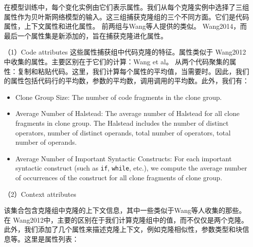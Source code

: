 
在模型训练中，每个变化实例由它们表示属性。我们从每个克隆实例中选择了三组属性作为贝叶斯网络模型的输入。这三组捕获克隆组的三个不同方面。它们是代码属性，上下文属性和进化属性。
前两组与Wang等人提供的类似。 \cite{} {Wang2014}，而最后一个属性集是新添加的，旨在捕获克隆进化属性。

（1）{Code attributes}
这些属性捕获组中代码克隆的特征。属性类似于\cite{} {Wang2012}中收集的属性。主要区别在于它们的计算：Wang et al。 从两个代码聚集的属性：复制和粘贴代码。这里，我们计算每个属性的平均值，当需要时。因此，我们的属性包括代码行的平均数，参数的平均数，调用调用的平均数。此外，我们有：
\begin{itemize}
\item Clone Group Size: 
The number of code fragments in the clone group.
\item Average Number of Halstead: 
The average number of Halstead for all clone fragments in clone group. The Halstead includes the number of distinct operators, number of distinct operands, total number of operators, total number of operands.
\item Average Number of Important Syntactic Constructs: 
For each important syntactic construct (such as \verb+if+, \verb+while+, etc.), we compute the average number of occurrences of the construct for all clone fragments of clone group.
\end{itemize}

（2）Context attributes

该集合包含克隆组中克隆的上下文信息，其中一些类似于Wang等人收集的那些。 在\cite{} {Wang2012}中，主要的区别在于我们计算克隆组中的值，而不仅仅是两个克隆。此外，我们添加了几个属性来描述克隆上下文，例如克隆相似性，参数类型和块信息等。这里是属性列表：

